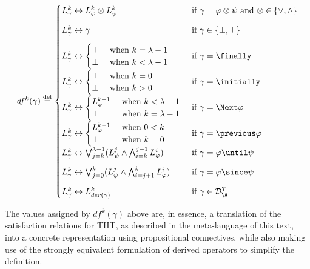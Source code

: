 \begin{align*}
df^k(\gamma) \defeq \begin{cases}
  L^k_{\gamma} \leftrightarrow L_{\varphi}^k \otimes L_{\psi}^k 
  &\text{ if } \gamma = \varphi \otimes \psi \text{ and } \otimes \in \{ \vee, \wedge\}\\[2ex]
  L^k_{\gamma} \leftrightarrow \gamma
  &\text{ if } \gamma \in \{ \bot, \top \}\\[2ex]
  L^k_\gamma \leftrightarrow \begin{cases} 
    \top &\text{ when } k = \lambda - 1\\
    \bot &\text{ when } k < \lambda - 1
  \end{cases}
  &\text{ if } \gamma = \finally \\[2ex]
  L^k_\gamma \leftrightarrow \begin{cases} 
    \top &\text{ when } k = 0\\
    \bot &\text{ when } k > 0
  \end{cases}
  &\text{ if } \gamma = \initially \\[2ex]
  L^k_\gamma \leftrightarrow \begin{cases} 
    L^{k+1}_{\varphi} &\text{ when } k < \lambda - 1\\
    \bot &\text{ when } k = \lambda - 1
    \end{cases}
  &\text{ if } \gamma = \Next \varphi \\[2ex]
  L^k_{\gamma} \leftrightarrow \begin{cases} 
    L^{k-1}_{\varphi} &\text{ when } 0 < k\\
    \bot &\text{ when } k = 0
    \end{cases}
  &\text{ if } \gamma = \previous \varphi \\[2ex]
  L^k_{\gamma} \leftrightarrow \bigvee_{j=k}^{\lambda-1}(L_\psi^j \wedge \bigwedge_{i=k}^{j-1}L_{\varphi}^i)
  &\text{ if } \gamma = \varphi \until \psi \\[2ex]
  L^k_{\gamma} \leftrightarrow \bigvee_{j=0}^{k}(L_\psi^j \wedge \bigwedge_{i=j+1}^{k}L_{\varphi}^i)
  &\text{ if } \gamma = \varphi \since \psi \\[2ex]
  L^k_{\gamma} \leftrightarrow L^k_{der(\gamma)}
  &\text{ if } \gamma \in \mathcal{D}^T_{\A}
\end{cases}
\end{align*}

The values assigned by $df^k(\gamma)$ above are, in essence, a
translation of the satisfaction relations for THT, as described in the
meta-language of this text, into a concrete representation using
propositional connectives, while also making use of the strongly
equivalent formulation of derived operators to simplify the
definition.

